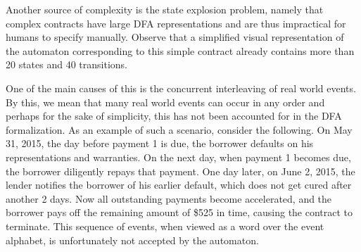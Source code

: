 \documentclass{article}
\begin{document}
Another source of complexity is the state explosion problem, namely that complex
contracts have large DFA representations and are thus impractical for humans
to specify manually.
Observe that a simplified visual representation of the automaton
\cite[Fig. 1]{contract_as_automaton}
corresponding to this simple contract already contains more than 20 states and
40 transitions.







One of the main causes of this is the concurrent interleaving of real world
events.
By this, we mean that many real world events can occur in any order and
perhaps for the sake of simplicity, this has not been accounted for in the DFA
formalization.
As an example of such a scenario, consider the following.
On May 31, 2015, the day before payment 1 is due, the borrower defaults on his
representations and warranties.
On the next day, when payment 1 becomes due, the borrower diligently
repays that payment.
One day later, on June 2, 2015, the lender notifies the borrower of his
earlier default, which does not get cured after another 2 days.
Now all outstanding payments become accelerated, and the borrower pays off
the remaining amount of \$525 in time, causing the contract to terminate.
This sequence of events, when viewed as a word over the event alphabet, is
unfortunately not accepted by the automaton.
\end{document}

